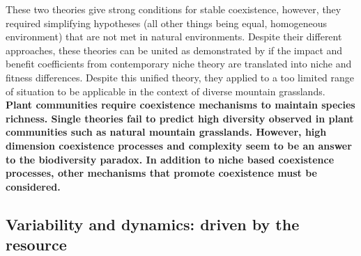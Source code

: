 These two theories give strong conditions for stable coexistence, however, they required simplifying hypotheses (all other things being equal, homogeneous environment) that are not met in natural environments. Despite their different approaches, these theories can be united as demonstrated by  \citet{letten_linking_2017} if the impact and benefit coefficients from contemporary niche theory are translated into niche and fitness differences. Despite this unified theory, they applied to a too limited range of situation to be applicable in the context of diverse mountain grasslands.\\
%
%
%
%
%






\textbf{Plant communities require coexistence mechanisms to maintain species richness. Single theories fail to predict high diversity observed in plant communities such as natural mountain grasslands. However, high dimension coexistence processes and complexity seem to be an answer to the biodiversity paradox. In addition to niche based coexistence processes, other mechanisms that promote coexistence must be considered.}




 \subsection{Variability and dynamics: driven by the resource}



